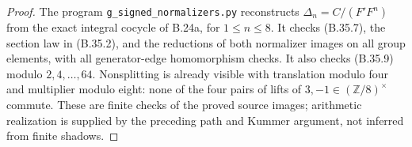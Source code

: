 \begin{proof}
The program \texttt{g\_signed\_normalizers.py} reconstructs
$\Delta_n=C/(F'F^n)$ from the exact integral cocycle of B.24a,
for $1\le n\le8$. It checks (B.35.7), the section law in
(B.35.2), and the reductions of both normalizer images on
all group elements, with all generator-edge homomorphism
checks. It also checks (B.35.9) modulo $2,4,\ldots,64$.
Nonsplitting is already visible with translation modulo four
and multiplier modulo eight: none of the four pairs of lifts
of $3,-1\in(\mathbb Z/8)^\times$ commute.
These are finite checks of the proved source images;
arithmetic realization is supplied by the preceding path
and Kummer argument, not inferred from finite shadows.
\end{proof}
